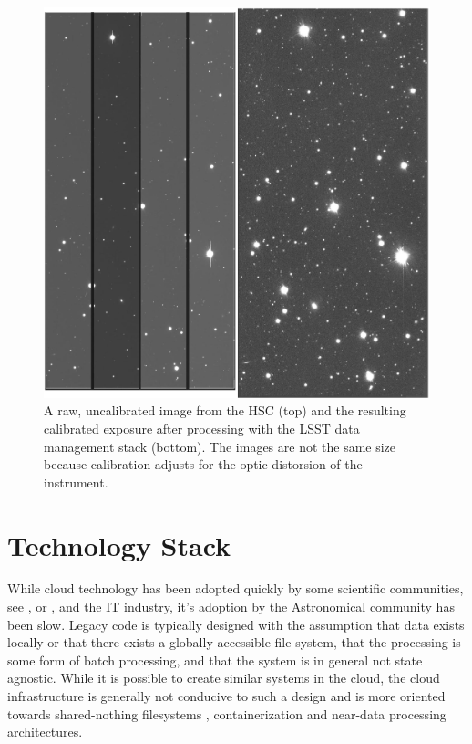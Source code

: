 \documentclass[a4paper, 10pt, conference]{ieeeconf}
\begin{document}

\begin{figure}[htb]
\centering
\includegraphics[angle=-90,width=0.8\columnwidth]{figures/raw2calexp.png}
\caption{A raw, uncalibrated image from the HSC (top) and the resulting calibrated exposure after processing with the LSST data management stack (bottom). The images are not the same size because calibration adjusts for the optic distorsion of the instrument.}
\label{fig:raw2calexp}
\end{figure}




\section{Technology Stack}
\label{sec:techstack}

While cloud technology has been adopted  quickly by some scientific communities, see \cite{NatLang}, \cite{HEPCloud} or \cite{IceCube}, and the IT industry, it's adoption by the Astronomical community has been slow. Legacy code is typically designed with the assumption that data exists locally or that there exists a globally accessible file system, that the processing is some form of batch processing, and that the system is in general not state agnostic. While it is possible to create similar systems in the cloud, the cloud infrastructure is generally not conducive to such a design and is more oriented towards shared-nothing filesystems \cite{sharednothing}, containerization \cite{containerization} and near-data processing architectures. 
\end{document}
